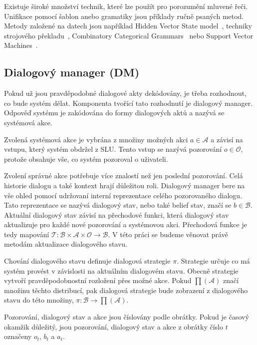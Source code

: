 Existuje široké množství technik, které lze použít pro porozumění mluvené řeči. 
Unifikace pomocí šablon anebo gramatiky jsou příklady ručně psaných metod.
Metody založené na datech jsou například Hidden Vector State model~\cite{he2005semantic}, techniky strojového překladu~\cite{wong2007learning}, Combinatory Categorical Grammars~\cite{zettlemoyer2007online} nebo Support Vector Machines~\cite{mairesse2009spoken}.

\subsection{Dialogový manager (DM)}

Pokud už jsou pravděpodobné dialogové akty dekódovány, je třeba rozhodnout, co bude systém dělat. 
Komponenta tvořící tato rozhodnutí je dialogový manager. 
Odpověď systému je zakódována do formy dialogových aktů a nazývá se systémová akce.

Zvolená systémová akce je vybrána z množiny možných akci $a \in \mathcal{A}$ a závisí na vstupu, který systém obdržel z SLU. 
Tento vstup se nazývá pozorování $o \in \mathcal{O}$, protože obsahuje vše, co systém pozoroval o uživateli.

Zvolení správné akce potřebuje více znalostí než jen poslední pozorování. 
Celá historie dialogu a také kontext hrají důležitou roli.
Dialogový manager bere na vše ohled pomocí udržovaní interní reprezentace celého pozorovaného dialogu. 
Tato reprezentace se nazývá dialogový stav, nebo také belief stav, značí se $b \in \mathcal{B}$.
Aktuální dialogový stav závisí na přechodové funkci, která dialogový stav aktualizuje pro každé nové pozorování a systémovou akci.
Přechodová funkce je tedy mapování $\mathcal{T} : \mathcal{B} \times \mathcal{A} \times \mathcal{O} \longrightarrow \mathcal{B}$.
V této práci se budeme věnovat právě metodám aktualizace dialogového stavu.

Chování dialogového stavu definuje dialogová strategie $\pi$.
Strategie určuje co má systém provést v závislosti na aktuálním dialogovém stavu.
Obecně strategie vytvoří pravděpodobnostní rozložení přes možné akce.
Pokud $\prod(\mathcal{A})$ značí množinu těchto distribucí, pak dialogová strategie bude zobrazení z dialogového stavu do této množiny, $\pi: \mathcal{B} \longrightarrow \prod(\mathcal{A})$.

Pozorování, dialogový stav a akce jsou číslovány podle obrátky. 
Pokud je časový okamžik důležitý, jsou pozorování, dialogový stav a akce z obrátky číslo $t$ označeny $o_t$, $b_t$ a $a_t$.

